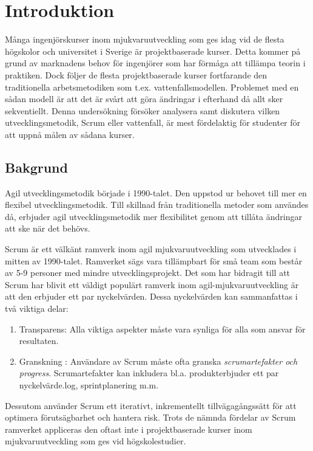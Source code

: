 \section{Introduktion}
\label{sec:Lieth_Wahid-introduction}
Många ingenjörskurser inom mjukvaruutveckling som ges idag vid de flesta högskolor och universitet i Sverige är projektbaserade
kurser. Detta kommer på grund av marknadens behov för ingenjörer som har förmåga att tillämpa teorin i praktiken. Dock följer de flesta  
projektbaserade kurser fortfarande den traditionella arbetsmetodiken som t.ex. vattenfallsmodellen. Problemet med en sådan modell är att 
det är svårt att göra ändringar i efterhand då allt sker sekventiellt. Denna undersökning försöker analysera samt diskutera vilken utvecklingsmetodik,
Scrum eller vattenfall, är mest fördelaktig för studenter för att uppnå målen av sådana kurser.

\subsection{Bakgrund}Agil utvecklingsmetodik började i 1990-talet. Den uppstod ur behovet till mer en flexibel utvecklingsmetodik. Till skillnad från traditionella metoder som användes då, erbjuder agil utvecklingsmetodik mer flexibilitet genom att tillåta ändringar att ske när det behövs.

Scrum är ett välkänt ramverk inom agil mjukvaruutveckling som utvecklades i mitten av 1990-talet.\cite{TheScrum} 
Ramverket sägs vara tillämpbart för små team som består av 5-9 personer med mindre utvecklingsprojekt. Det som har bidragit till att Scrum har blivit ett väldigt populärt ramverk inom agil-mjukvaruutveckling är att den erbjuder ett par nyckelvärden. Dessa nyckelvärden kan sammanfattas i två viktiga delar: 
\begin{enumerate}\label{two}
	\item Transparens: Alla viktiga aspekter måste vara synliga för alla som ansvar för resultaten.\cite{TheScrum}
	\item Granskning : Användare av Scrum måste ofta granska \textit{scrumartefakter och progress}. Scrumartefakter kan inkludera
	bl.a. produkterbjuder ett par nyckelvärde.log, sprintplanering m.m.\cite{TheScrum}
\end{enumerate} 
Dessutom använder Scrum ett iterativt, inkrementellt tillvägagångssätt för att optimera förutsägbarhet och hantera risk.\cite{TheScrum} Trots de nämnda fördelar av Scrum ramverket appliceras den oftast inte i projektbaserade kurser inom mjukvaruutveckling som ges vid högskolestudier. 

